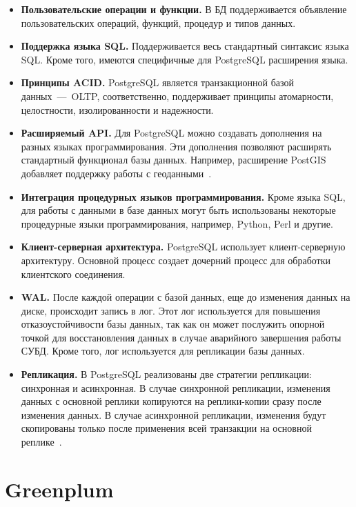 \begin{itemize}
	\item \textbf{Пользовательские операции и функции.} В БД поддерживается объявление пользовательских операций, функций, процедур и типов данных.
	\item \textbf{Поддержка языка SQL.} Поддерживается весь стандартный синтаксис языка SQL. Кроме того, имеются специфичные для PostgreSQL расширения языка.
	\item \textbf{Принципы ACID.} PostgreSQL является транзакционной базой данных~---~OLTP, соответственно, поддерживает принципы атомарности, целостности, изолированности и надежности.
	\item \textbf{Расширяемый API.} Для PostgreSQL можно создавать дополнения на разных языках программирования. Эти дополнения позволяют расширять стандартный функционал базы данных. Например, расширение PostGIS добавляет поддержку работы с геоданными~\cite{obe2021postgis}.
	\item \textbf{Интеграция процедурных языков программирования.} Кроме языка SQL, для работы с данными в базе данных могут быть использованы некоторые процедурные языки программирования, например, Python, Perl и другие.
	\item \textbf{Клиент-серверная архитектура.} PostgreSQL использует клиент-серверную архитектуру. Основной процесс создает дочерний процесс для обработки клиентского соединения.
	\item \textbf{WAL.} После каждой операции с базой данных, еще до изменения данных на диске, происходит запись в лог. Этот лог используется для повышения отказоустойчивости базы данных, так как он может послужить опорной точкой для восстановления данных в случае аварийного завершения работы СУБД. Кроме того, лог используется для репликации базы данных.
	\item \textbf{Репликация.} В PostgreSQL реализованы две стратегии репликации: синхронная и асинхронная. В случае синхронной репликации, изменения данных с основной реплики копируются на реплики-копии сразу после изменения данных. В случае асинхронной репликации, изменения будут скопированы только после применения всей транзакции на основной реплике~\cite{boszormenyi2013postgresql}.
\end{itemize}



\section{Greenplum}


